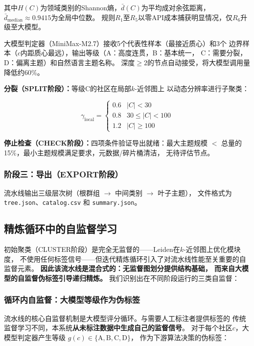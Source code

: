 \documentclass[10pt,twocolumn,twoside]{ctexart}
\begin{document}
其中$H(C)$为领域类别的Shannon熵，$\bar{d}(C)$为平均成对余弦距离，
$\bar{d}_{\text{median}} \approx 0.9415$为全局中位数。
规则$R_1$至$R_5$以零API成本捕获明显情况，仅$R_6$升级至大模型。

大模型判定器（MiniMax-M2.7）接收5个代表性样本（最接近质心）和3个
边界样本（$c$内距质心最远），输出等级（A：高度连贯，B：基本统一，
C：需要分裂，D：偏离主题）和自然语言主题名称。
深度$\geq 2$的节点自动接受，将大模型调用量降低约60\%。

\textbf{分裂（SPLIT阶段）：}等级C的社区在局部$k$-近邻图上
以动态分辨率进行子聚类：

\begin{equation}
    \gamma_{\text{local}} = 
    \begin{cases}
        0.6 & |C| < 30 \\
        0.8 & 30 \leq |C| < 100 \\
        1.2 & |C| \geq 100
    \end{cases}
    \label{eq:local_gamma}
\end{equation}

\textbf{停止检查（CHECK阶段）：}四项条件验证导出就绪：最大主题规模
$<$ 总量的15\%，最小主题规模满足要求，元数据/碎片桶清洁，
无待评估节点。

\subsubsection{阶段三：导出（EXPORT阶段）}
流水线输出三级层次树（根群组 $\rightarrow$ 中间类别 $\rightarrow$ 叶子主题），
文件格式为 \texttt{tree.json}、\texttt{catalog.csv} 和 \texttt{summary.json}。

\subsection{精炼循环中的自监督学习}

初始聚类（CLUSTER阶段）是完全无监督的——Leiden在$k$-近邻图上优化模块度，
不使用任何标签信号——但迭代精炼循环引入了对流水线性能至关重要的自监督元素。
\textbf{因此该流水线是混合式的：无监督图划分提供结构基础，
而来自大模型的自监督伪标签引导递归精炼。}
我们识别出在不同阶段运行的三类自监督：

\subsubsection{循环内自监督：大模型等级作为伪标签}

流水线的核心自监督机制是大模型评分循环。与需要人工标注者提供标签的
传统监督学习不同，本系统\textbf{从未标注数据中生成自己的监督信号}。
对于每个社区$c$，大模型判定器产生等级
$g(c) \in \{\text{A}, \text{B}, \text{C}, \text{D}\}$，
作为下游算法决策的伪标签：
\end{document}

